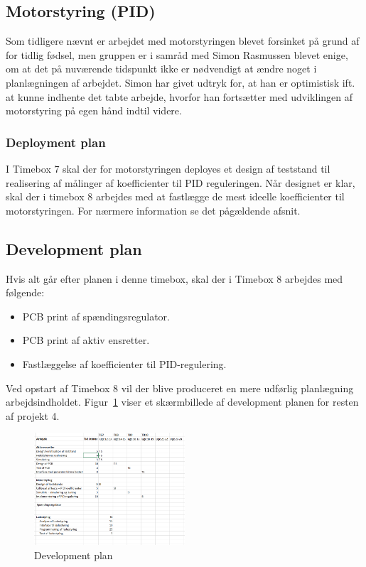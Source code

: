 
\subsection{Motorstyring (PID)}
\label{sec:motorstyring-pid}

Som tidligere nævnt er arbejdet med motorstyringen blevet forsinket på grund af for tidlig fødsel, men gruppen er i samråd med Simon Rasmussen blevet enige, om at det på nuværende tidspunkt ikke er nødvendigt at ændre noget i planlægningen af arbejdet. Simon har givet udtryk for, at han er optimistisk ift. at kunne indhente det tabte arbejde, hvorfor han fortsætter med udviklingen af motorstyring på egen hånd indtil videre.

\subsubsection{Deployment plan}
\label{sec:deployment-plan-2}

I Timebox 7 skal der for motorstyringen deployes et design af teststand til realisering af målinger af koefficienter til PID reguleringen. Når designet er klar, skal der i timebox 8 arbejdes med at fastlægge de mest ideelle koefficienter til motorstyringen. For nærmere information se det pågældende afsnit.

\subsection{Development plan}
\label{sec:development-plan}

Hvis alt går efter planen i denne timebox, skal der i Timebox 8 arbejdes med følgende:
\begin{itemize}
\item PCB print af spændingsregulator.
\item PCB print af aktiv ensretter.
\item Fastlæggelse af koefficienter til PID-regulering.
\end{itemize}

Ved opstart af Timebox 8 vil der blive produceret en mere udførlig planlægning arbejdsindholdet. Figur~\ref{fig:devplan} viser et skærmbillede af development planen for resten af projekt 4.

\begin{figure}[h]
  \centering
  \includegraphics[width=0.5\textwidth]{devplan.png}
  \caption{Development plan}
  \label{fig:devplan}
\end{figure}
\clearpage
